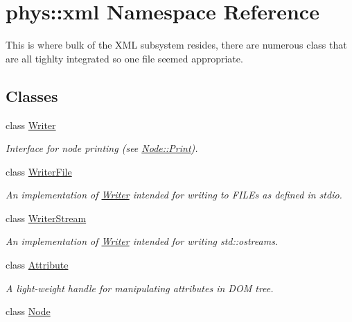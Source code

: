 \hypertarget{namespacephys_1_1xml}{
\section{phys::xml Namespace Reference}
\label{d9/d27/namespacephys_1_1xml}
}


This is where bulk of the XML subsystem resides, there are numerous class that are all tighlty integrated so one file seemed appropriate.  


\subsection*{Classes}
\begin{DoxyCompactItemize}
\item 
class \hyperlink{classphys_1_1xml_1_1Writer}{Writer}
\begin{DoxyCompactList}\small\item\em Interface for node printing (see \hyperlink{classphys_1_1xml_1_1Node_adbe10968a804a94552e1dc8223744406}{Node::Print}). \item\end{DoxyCompactList}\item 
class \hyperlink{classphys_1_1xml_1_1WriterFile}{WriterFile}
\begin{DoxyCompactList}\small\item\em An implementation of \hyperlink{classphys_1_1xml_1_1Writer}{Writer} intended for writing to FILEs as defined in stdio. \item\end{DoxyCompactList}\item 
class \hyperlink{classphys_1_1xml_1_1WriterStream}{WriterStream}
\begin{DoxyCompactList}\small\item\em An implementation of \hyperlink{classphys_1_1xml_1_1Writer}{Writer} intended for writing std::ostreams. \item\end{DoxyCompactList}\item 
class \hyperlink{classphys_1_1xml_1_1Attribute}{Attribute}
\begin{DoxyCompactList}\small\item\em A light-\/weight handle for manipulating attributes in DOM tree. \item\end{DoxyCompactList}\item 
class \hyperlink{classphys_1_1xml_1_1Node}{Node}

\end{DoxyCompactItemize}
